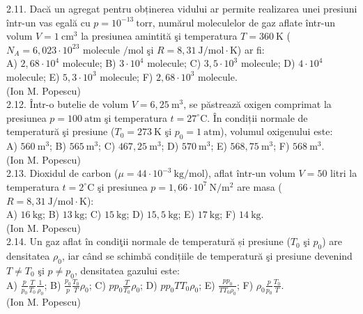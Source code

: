 2.11. Dacă un agregat pentru obținerea vidului ar permite realizarea unei presiuni într-un vas egală cu $p=10^{-13} \mathrm{~torr}$, numărul moleculelor de gaz aflate într-un volum $V=1 \mathrm{~cm}^{3}$ la presiunea amintită şi temperatura $T=360 \mathrm{~K}$ ($N_{A}=6,023 \cdot 10^{23}$ molecule $/ \mathrm{mol}$ şi $R=8,31 \mathrm{~J} / \mathrm{mol} \cdot \mathrm{K}$) ar fi:\\ A) $2,68 \cdot 10^{4}$ molecule; B) $3 \cdot 10^{4}$ molecule; C) $3,5 \cdot 10^{3}$ molecule; D) $4 \cdot 10^{4}$ molecule; E) $5,3 \cdot 10^{3}$ molecule; F) $2,68 \cdot 10^{3}$ molecule.\\ (Ion M. Popescu)\\

2.12. Într-o butelie de volum $V=6,25 \mathrm{~m}^{3}$, se păstrează oxigen comprimat la presiunea $p=100 \mathrm{~atm}$ şi temperatura $t=27^{\circ} \mathrm{C}$. În condiții normale de temperatură şi presiune ($T_{0}=273 \mathrm{~K}$ şi $p_{0}=1 \mathrm{~atm}$), volumul oxigenului este:\\ A) $560 \mathrm{~m}^{3}$; B) $565 \mathrm{~m}^{3}$; C) $467,25 \mathrm{~m}^{3}$; D) $570 \mathrm{~m}^{3}$; E) $568,75 \mathrm{~m}^{3}$; F) $568 \mathrm{~m}^{3}$.\\ (Ion M. Popescu)\\

2.13. Dioxidul de carbon ($\mu=44 \cdot 10^{-3} \mathrm{~kg} / \mathrm{mol}$), aflat într-un volum $V=50$ litri la temperatura $t=2^{\circ} \mathrm{C}$ şi presiunea $p=1,66 \cdot 10^{7} \mathrm{~N} / \mathrm{m}^{2}$ are masa ($R=8,31 \mathrm{~J} / \mathrm{mol} \cdot \mathrm{K}$):\\ A) $16 \mathrm{~kg}$; B) $13 \mathrm{~kg}$; C) $15 \mathrm{~kg}$; D) $15,5 \mathrm{~kg}$; E) $17 \mathrm{~kg}$; F) $14 \mathrm{~kg}$.\\ (Ion M. Popescu)\\

2.14. Un gaz aflat în condiţii normale de temperatură și presiune ($T_{0}$ şi $p_{0}$) are densitatea $\rho_{0}$, iar când se schimbă condițiile de temperatură şi presiune devenind $T \neq T_{0}$ şi $p \neq p_{0}$, densitatea gazului este:\\ A) $\frac{p}{p_{0}} \frac{T}{T_{0}} \frac{1}{\rho_{0}}$; B) $\frac{p_{0}}{p} \frac{T_{0}}{T} \rho_{0}$; C) $p p_{0} \frac{T}{T_{0}} \rho_{0}$; D) $p p_{0} T T_{0} \rho_{0}$; E) $\frac{p p_{0}}{T T_{0} \rho_{0}}$; F) $\rho_{0} \frac{p}{p_{0}} \frac{T_{0}}{T}$.\\ (Ion M. Popescu)\\

